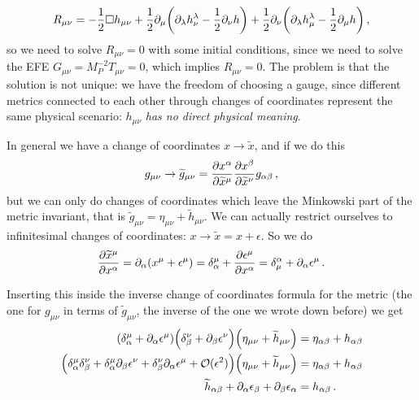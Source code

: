 \documentclass[main.tex]{subfiles}
\begin{document}
%
\begin{align}
R_{\mu \nu } = - \frac{1}{2} \square h_{\mu \nu } 
+ \frac{1}{2} \partial_{\mu } \qty(\partial_{\lambda } h^{\lambda }_{\nu } - \frac{1}{2} \partial_{\nu }h)
+ \frac{1}{2} \partial_{\nu }\qty(\partial_{\lambda}  h^{\lambda }_{\mu } - \frac{1}{2} \partial_{\mu} h)
\,,
\end{align}
%
so we need to solve \(R_{\mu \nu }  =0 \) with some initial conditions, since we need to solve the EFE \(G_{\mu \nu } = M_P^{-2} T_{\mu \nu } = 0\), which implies \(R_{\mu \nu }= 0 \). 
The problem is that the solution is not unique: we have the freedom of choosing a gauge, since different metrics connected to each other through changes of coordinates represent the same physical scenario: \(h_{\mu \nu } \) \emph{has no direct physical meaning}. 

In general we have a change of coordinates \(x \to \widetilde{x}\), and if we do this 
%
\begin{align}
g_{\mu \nu } \to \widetilde{g}_{\mu \nu } = \pdv{x^{\alpha }}{\widetilde{x}^{\mu  }} \pdv{x^{\beta }}{\widetilde{x}^{\nu }} g_{\alpha \beta }
\,,
\end{align}
%
but we can only do changes of coordinates which leave the Minkowski part of the metric invariant, that is \(\widetilde{g}_{\mu \nu } = \eta_{\mu \nu } + \widetilde{h}_{\mu \nu }\). We can actually restrict ourselves to infinitesimal changes of coordinates: \(x \to \widetilde{x} = x + \epsilon \). So we do 
%
\begin{align}
\pdv{\widetilde{x}^{\mu }}{x^{\alpha }} = \partial_{\alpha } \qty( x^{ \mu } + \epsilon^{\mu })
= \delta_{\alpha }^{\mu } + \pdv{\epsilon^{\mu }}{x^{\alpha }} = \delta_{\mu }^{\alpha } + \partial_{\alpha } \epsilon^{\mu }
\,.
\end{align}

Inserting this inside the inverse change of coordinates formula for the metric (the one for \(g_{\mu \nu }\) in terms of \(\widetilde{g}_{\mu \nu }\), the inverse of the one we wrote down before) we get 
%
\begin{subequations}
\begin{align}
\qty(\delta^{\mu}_{\alpha } + \partial_{\alpha } \epsilon^{\mu }) 
\qty(\delta^{\nu }_{\beta } + \partial_{\beta } \epsilon^{\nu }) 
\qty(\eta_{\mu \nu } + \widetilde{h}_{\mu \nu }) 
&= \eta_{\alpha \beta } 
+h_{\alpha \beta }  \\
\qty(\delta^{\mu }_{\alpha } \delta^{\nu }_{\beta } + \delta^{\mu }_{\alpha } \partial_{\beta } \epsilon^{\nu } 
+ \delta^{\nu  }_{\beta  } \partial_{\alpha  } \epsilon^{\mu  } + \mathcal{O} (\epsilon^2))  \qty(\eta_{\mu \nu } + \widetilde{h}_{\mu \nu }) &= \eta_{\alpha \beta }  + h_{\alpha \beta }  \\
\widetilde{h}_{\alpha \beta }+
\partial_{\alpha } \epsilon_{\beta } + \partial_{\beta } \epsilon_{\alpha } &= h_{\alpha \beta } 
\,.
\end{align}
\end{subequations}
\end{document}
